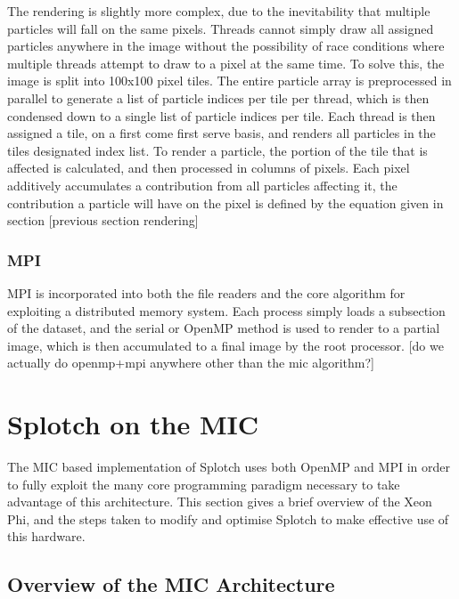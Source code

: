\documentclass{easychair}
\begin{document}
The rendering is slightly more complex, due to the inevitability that multiple particles will fall on the same pixels. 
Threads cannot simply draw all assigned particles anywhere in the image without the possibility of race conditions 
where multiple threads attempt to draw to a pixel at the same time. To solve this, the image is split into 100x100 pixel 
tiles. The entire particle array is preprocessed in parallel to generate a list of particle indices per tile per thread, 
which is then condensed down to a single list of particle indices per tile. Each thread is then assigned a tile, on a 
first come first serve basis, and renders all particles in the tiles designated index list. To render a particle, the 
portion of the tile that is affected is calculated, and then processed in columns of pixels. Each pixel additively 
accumulates a contribution from all particles affecting it, the contribution a particle will have on the pixel is defined 
by the equation given in section [previous section rendering]

\subsubsection{MPI}
\label{sect:mpisplotch}

MPI is incorporated into both the file readers and the core algorithm for exploiting a distributed memory system. Each 
process simply loads a subsection of the dataset, and the serial or OpenMP method is used to render to a partial image, 
which is then accumulated to a final image by the root processor. [do we actually do openmp+mpi anywhere other than 
the mic algorithm?]


\section{Splotch on the MIC}
\label{sect:micsplotch}

The MIC based implementation of Splotch uses both OpenMP and MPI in order to fully exploit the many core 
programming paradigm necessary to take advantage of this architecture. This section gives a brief overview of the 
Xeon Phi, and the steps taken to modify and optimise Splotch to make effective use of this hardware.

\subsection{Overview of the MIC Architecture}
\label{sect:mic}
\end{document}
